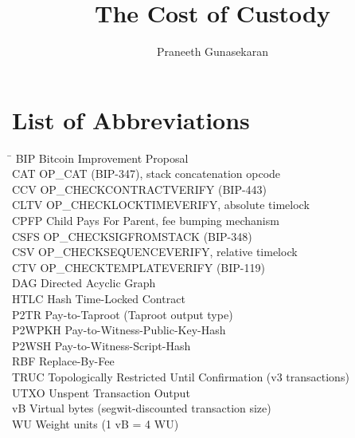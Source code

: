 \documentclass[doublespace,nopageskip]{VTthesis}
\title{The Cost of Custody}
\author{Praneeth Gunasekaran}
\begin{document}
\frontmatter
\tableofcontents
\listoffigures
\listoftables

\chapter*{List of Abbreviations}
\begin{tabbing}
\hspace{3cm} \= \kill
BIP     \> Bitcoin Improvement Proposal \\
CAT     \> OP\_CAT (BIP-347), stack concatenation opcode \\
CCV     \> OP\_CHECKCONTRACTVERIFY (BIP-443) \\
CLTV    \> OP\_CHECKLOCKTIMEVERIFY, absolute timelock \\
CPFP    \> Child Pays For Parent, fee bumping mechanism \\
CSFS    \> OP\_CHECKSIGFROMSTACK (BIP-348) \\
CSV     \> OP\_CHECKSEQUENCEVERIFY, relative timelock \\
CTV     \> OP\_CHECKTEMPLATEVERIFY (BIP-119) \\
DAG     \> Directed Acyclic Graph \\
HTLC    \> Hash Time-Locked Contract \\
P2TR    \> Pay-to-Taproot (Taproot output type) \\
P2WPKH  \> Pay-to-Witness-Public-Key-Hash \\
P2WSH   \> Pay-to-Witness-Script-Hash \\
RBF     \> Replace-By-Fee \\
TRUC    \> Topologically Restricted Until Confirmation (v3 transactions) \\
UTXO    \> Unspent Transaction Output \\
vB      \> Virtual bytes (segwit-discounted transaction size) \\
WU      \> Weight units (1 vB = 4 WU)
\end{tabbing}

\mainmatter











%
%

\appendix
\begin{appendices}
  
\end{appendices}
\end{document}
